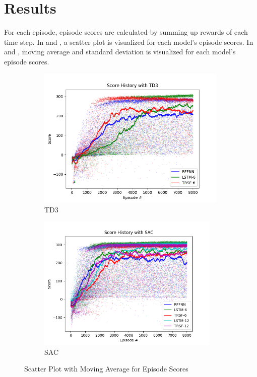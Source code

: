 \section{Results}

For each episode, episode scores are calculated by summing up rewards of each time step. 
In  and , a scatter plot is visualized for each model's episode scores. 
In  and , moving average and standard deviation is visualized for each model's episode scores. 

\begin{figure}[!ht]
	\centering
	\begin{subfigure}{.49\textwidth}
		\centering
		\includegraphics[width=0.99\textwidth]{figures/bipedal/SCT_TD3_RFFNN_LSTM-6_TRSF-6.png}
		\caption{TD3}
		\label{fig:td3_scatter_ep_rewards}
	\end{subfigure}
	\begin{subfigure}{.49\textwidth}
		\centering
		\includegraphics[width=0.95\textwidth]{figures/bipedal/SCT_SAC_RFFNN_LSTM-6_TRSF-6_LSTM-12_TRSF-12.png}
		\caption{SAC}
		\label{fig:sac_scatter_ep_rewards}
	\end{subfigure}
	\caption{Scatter Plot with Moving Average for Episode Scores}
\end{figure}

